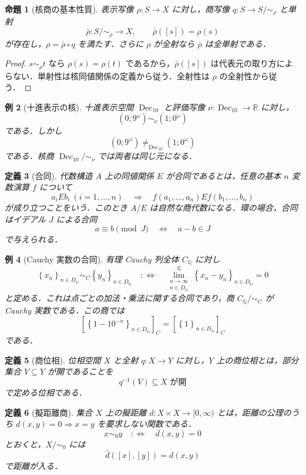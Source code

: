 \documentclass[a4paper,11pt]{ltjsarticle}
\theoremstyle{jpdef}
\newtheorem{definition}{定義}[section]
\newtheorem{example}[definition]{例}
\theoremstyle{jpthm}
\newtheorem{proposition}[definition]{命題}
\newcommand{\N}{\mathbb{N}}
\newcommand{\Q}{\mathbb{Q}}
\newcommand{\R}{\mathbb{R}}
\newcommand{\Dec}{\operatorname{Dec}_{10}}
\newcommand{\DN}{D_{\N}}
\newcommand{\seq}[2]{\left\{#1\right\}_{#2}}
\begin{document}
\begin{proposition}[核商の基本性質]
表示写像 \(\rho:S\to X\) に対し，商写像 \(q:S\to S/\sim_\rho\) と単射
\[
  \bar\rho:S/\sim_\rho\to X,
  \qquad
  \bar\rho([s])=\rho(s)
\]
が存在し，\(\rho=\bar\rho\circ q\) を満たす．さらに \(\rho\) が全射なら \(\bar\rho\) は全単射である．
\end{proposition}

\begin{proof}
\(s\sim_\rho t\) なら \(\rho(s)=\rho(t)\) であるから，\(\bar\rho([s])\) は代表元の取り方によらない．単射性は核同値関係の定義から従う．全射性は \(\rho\) の全射性から従う．
\end{proof}

\begin{example}[十進表示の核]
十進表示空間 \(\Dec\) と評価写像 \(\nu:\Dec\to\R\) に対し，
\[
  (0;9^\omega)\sim_\nu (1;0^\omega)
\]
である．しかし
\[
  (0;9^\omega)\ne_{\Dec}(1;0^\omega)
\]
である．核商 \(\Dec/\sim_\nu\) では両者は同じ元になる．
\end{example}

\begin{definition}[合同]
代数構造 \(A\) 上の同値関係 \(E\) が合同であるとは，任意の基本 \(n\) 変数演算 \(f\) について
\[
  a_i E b_i\ (i=1,\ldots,n)
  \quad\Longrightarrow\quad
  f(a_1,\ldots,a_n)E f(b_1,\ldots,b_n)
\]
が成り立つことをいう．このとき \(A/E\) は自然な商代数になる．環の場合，合同はイデアル \(J\) による合同
\[
  a\equiv b\pmod J
  \quad\Longleftrightarrow\quad
  a-b\in J
\]
で与えられる．
\end{definition}

\begin{example}[Cauchy 実数の合同]
有理 Cauchy 列全体 \(C_\Q\) に対し
\[
  \seq{x_n}{n\in\DN}\sim_C\seq{y_n}{n\in\DN}
  \quad:\Longleftrightarrow\quad
  \lim_{\substack{n\to\infty\\ n\in\DN}}^{\Q}\seq{x_n-y_n}{n\in\DN}=0
\]
と定める．これは点ごとの加法・乗法に関する合同であり，商 \(C_\Q/\sim_C\) が Cauchy 実数である．この商では
\[
  [\seq{1-10^{-n}}{n\in\DN}]_C=[\seq{1}{n\in\DN}]_C
\]
である．
\end{example}

\begin{definition}[商位相]
位相空間 \(X\) と全射 \(q:X\to Y\) に対し，\(Y\) 上の商位相とは，部分集合 \(V\subseteq Y\) が開であることを
\[
  q^{-1}(V)\subseteq X\text{ が開}
\]
で定める位相である．
\end{definition}

\begin{definition}[擬距離商]
集合 \(X\) 上の擬距離 \(d:X\times X\to[0,\infty)\) とは，距離の公理のうち \(d(x,y)=0\Rightarrow x=y\) を要求しない関数である．
\[
  x\sim_0 y\quad:\Longleftrightarrow\quad d(x,y)=0
\]
とおくと，\(X/\sim_0\) には
\[
  \bar d([x],[y])=d(x,y)
\]
で距離が入る．
\end{definition}
\end{document}
